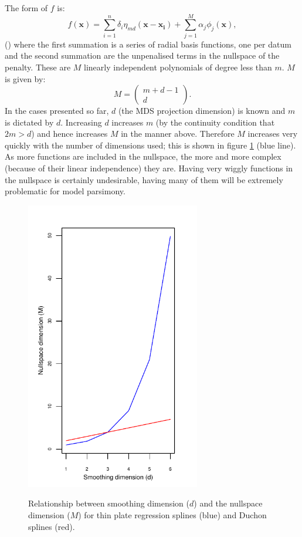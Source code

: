 The form of $f$ is:
\begin{equation}
f(\mathbf{x}) = \sum_{i=1}^n \delta_i \eta_{md}(\mathbf{x}-\mathbf{x_i}) + \sum_{j=1}^M \alpha_j \phi_j(\mathbf{x}),
\label{tprs-basis}
\end{equation}
(\cite{wood2003}) where the first summation is a series of radial basis functions, one per datum and the second summation are the unpenalised terms in the nullspace of the penalty. These are $M$ linearly independent polynomials of degree less than $m$. $M$ is given by:
\begin{equation*}
M=\begin{pmatrix} m+d-1 \\ d  \end{pmatrix}.
\end{equation*}
In the cases presented so far, $d$ (the MDS projection dimension) is known and $m$ is dictated by $d$. Increasing $d$ increases $m$ (by the continuity condition that $2m>d$) and hence increases $M$ in the manner above. Therefore $M$ increases very quickly with the number of dimensions used; this is shown in figure \ref{nullspace-dim} (blue line). As more functions are included in the nullspace, the more and more complex (because of their linear independence) they are. Having very wiggly functions in the nullspace is certainly undesirable, having many of them will be extremely problematic for model parsimony. 

\begin{figure}
\centering
\includegraphics[width=3in]{gds/figs/nullspace-dim.pdf} \\
\caption{Relationship between smoothing dimension ($d$) and the nullspace dimension ($M$) for thin plate regression splines (blue) and Duchon splines (red).}
\label{nullspace-dim}
\end{figure}

